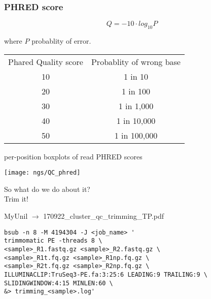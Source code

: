 \documentclass[xcolor=dvipsnames]{beamer}
\begin{document}
\begin{frame}
	\frametitle{PHRED score}
	$$ Q = -10 \cdot log_{10}P $$

	\vspace{0.5cm}
	\large
	where $P$ probablity of error.

	\vspace{1cm}
	\begin{tabular}{c c}
	Phared Quality score & Probablity of wrong base \\
	10 & 1 in 10  \\
	20 & 1 in 100  \\
	30 & 1 in 1,000 \\
	40 & 1 in 10,000 \\
	50 & 1 in 100,000 \\
	\end{tabular}
\end{frame}

\begin{frame}
	\large
	per-position boxplots of read PHRED scores \\
	\begin{center}
		\texttt{[image: ngs/QC\_phred]}
	\end{center}
\end{frame}

\begin{frame}
	\begin{center}
		So what do we do about it? \\
		Trim it!
	\end{center}
\end{frame}

\begin{frame}[fragile]
	\begin{center}
		\Large
		MyUnil $\rightarrow$ 170922\_cluster\_qc\_trimming\_TP.pdf
	\end{center}
\footnotesize
\begin{verbatim}
bsub -n 8 -M 4194304 -J <job_name> '
trimmomatic PE -threads 8 \
<sample>_R1.fastq.gz <sample>_R2.fastq.gz \
<sample>_R1t.fq.gz <sample>_R1np.fq.gz \
<sample>_R2t.fq.gz <sample>_R2np.fq.gz \
ILLUMINACLIP:TruSeq3-PE.fa:3:25:6 LEADING:9 TRAILING:9 \
SLIDINGWINDOW:4:15 MINLEN:60 \
&> trimming_<sample>.log'
\end{verbatim}
\end{frame}
\end{document}
